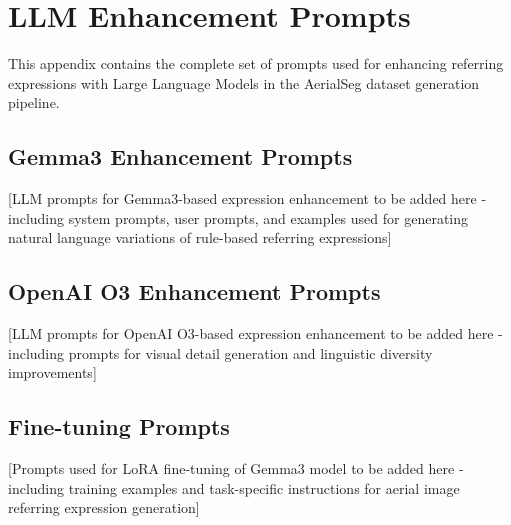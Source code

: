 \chapter{LLM Enhancement Prompts}
\label{chapter:appendixA}

This appendix contains the complete set of prompts used for enhancing referring expressions with Large Language Models in the AerialSeg dataset generation pipeline.

\section{Gemma3 Enhancement Prompts}

[LLM prompts for Gemma3-based expression enhancement to be added here - including system prompts, user prompts, and examples used for generating natural language variations of rule-based referring expressions]

\section{OpenAI O3 Enhancement Prompts}

[LLM prompts for OpenAI O3-based expression enhancement to be added here - including prompts for visual detail generation and linguistic diversity improvements]

\section{Fine-tuning Prompts}

[Prompts used for LoRA fine-tuning of Gemma3 model to be added here - including training examples and task-specific instructions for aerial image referring expression generation]